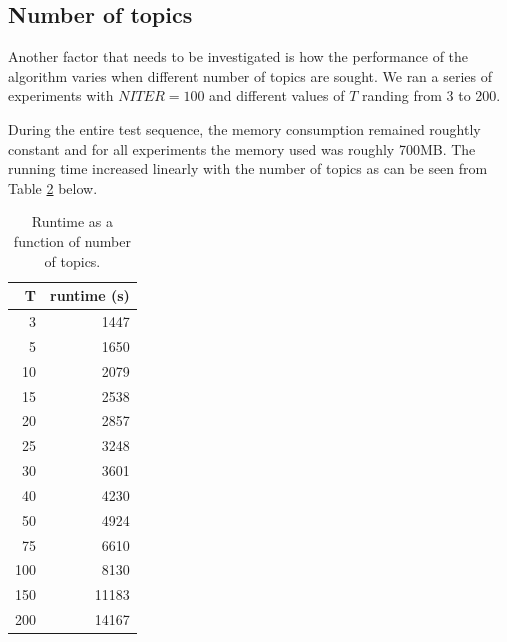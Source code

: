\documentclass[11pt]{article}
\begin{document}
\begin{table}
\begin{footnotesize}
\begin{raggedright}
\begin{tabular}{|p{4.7in} p{1.2in} |}
        \hline
        \end{tabular}
        \label{table:topics}
        \end{raggedright}
        \end{footnotesize}
        \end{table} 


    \subsection{Number of topics}

        Another factor that needs to be investigated is how the performance of the algorithm
        varies when different number of topics are sought.
        We ran a series of experiments with $NITER=100$ and different values of $T$ randing
        from 3 to 200.

        During the entire test sequence, the memory consumption remained roughtly constant
        and for all experiments the memory used was roughly 700MB.
        The running time increased linearly with the number of topics as can be seen from
        Table \ref{table:runtimeT} below.

        \begin{table}[htb]
        \centering
        \caption{Runtime as a function of number of topics.}
        \begin{tabular}{|r r|}
        \hline
        T   &   runtime (s) \\
        \hline
            3 &  1447 \\
            5 &  1650 \\
            10 &  2079 \\
            15 &  2538 \\
            20 &  2857 \\
            25 &  3248 \\
            30 &  3601 \\
            40 &  4230 \\
            50 &  4924 \\
            75 &  6610 \\
            100 &  8130 \\
            150 &  11183 \\
            200 &  14167 \\
        \hline
        \end{tabular}
        \label{table:runtimeT}
        \end{table} 
        
\end{document}
